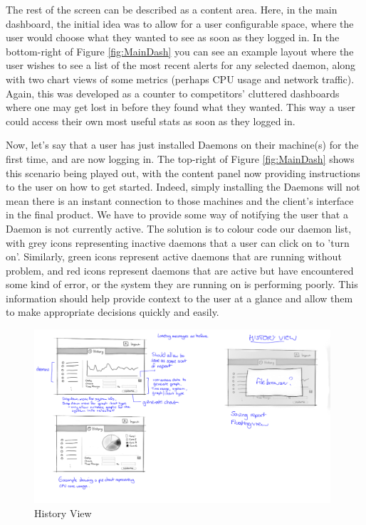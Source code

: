 \documentclass{l3proj}
\begin{document}
The rest of the screen can be described as a content area.  Here, in the main dashboard, the initial idea was to allow for a user configurable space, where the user would choose what they wanted to see as soon as they logged in. In the bottom-right of Figure \ref{fig:MainDash} you can see an example layout where the user wishes to see a list of the most recent alerts for any selected daemon, along with two chart views of some metrics (perhaps CPU usage and network traffic). Again, this was developed as a counter to competitors' cluttered dashboards where one may get lost in before they found what they wanted. This way a user could access their own most useful stats as soon as they logged in.

Now, let's say that a user has just installed Daemons on their machine(s) for the first time, and are now logging in. The top-right of Figure \ref{fig:MainDash} shows this scenario being played out, with the content panel now providing instructions to the user on how to get started. Indeed, simply installing the Daemons will not mean there is an instant connection to those machines and the client's interface in the final product. We have to provide some way of notifying the user that a Daemon is not currently active. The solution is to colour code our daemon list, with grey icons representing inactive daemons that a user can click on to 'turn on'. Similarly, green icons represent active daemons that are running without problem, and red icons represent daemons that are active but have encountered some kind of error, or the system they are running on is performing poorly. This information should help provide context to the user at a glance and allow them to make appropriate decisions quickly and easily.

\begin{figure}[H]
\centering
\includegraphics[width=110mm]{Concept_Designs/HistoryView.png}
\caption{History View}
\label{fig:HistoryView}
\end{figure}
\end{document}
